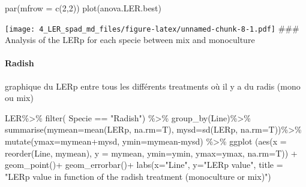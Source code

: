 \documentclass[
]{article}
\newenvironment{Shaded}{\begin{snugshade}}{\end{snugshade}}
\newcommand{\AttributeTok}[1]{\textcolor[rgb]{0.77,0.63,0.00}{#1}}
\newcommand{\DecValTok}[1]{\textcolor[rgb]{0.00,0.00,0.81}{#1}}
\newcommand{\FunctionTok}[1]{\textcolor[rgb]{0.00,0.00,0.00}{#1}}
\newcommand{\NormalTok}[1]{#1}
\newcommand{\SpecialCharTok}[1]{\textcolor[rgb]{0.00,0.00,0.00}{#1}}
\newcommand{\StringTok}[1]{\textcolor[rgb]{0.31,0.60,0.02}{#1}}
\begin{document}
\begin{Shaded}
\begin{Highlighting}[]
\FunctionTok{par}\NormalTok{(}\AttributeTok{mfrow =} \FunctionTok{c}\NormalTok{(}\DecValTok{2}\NormalTok{,}\DecValTok{2}\NormalTok{))}
\FunctionTok{plot}\NormalTok{(anova.LER.best)}
\end{Highlighting}
\end{Shaded}

\texttt{[image: 4\_LER\_spad\_md\_files/figure-latex/unnamed-chunk-8-1.pdf]}
\#\#\# Analysis of the LERp for each specie between mix and monoculture

\hypertarget{radish}{%
\paragraph{Radish}\label{radish}}

graphique du LERp entre tous les différents treatments où il y a du
radis (mono ou mix)

\begin{Shaded}
\begin{Highlighting}[]
\NormalTok{LER}\SpecialCharTok{\%\textgreater{}\%}
  \FunctionTok{filter}\NormalTok{( Specie }\SpecialCharTok{==} \StringTok{"Radish"}\NormalTok{) }\SpecialCharTok{\%\textgreater{}\%}
  \FunctionTok{group\_by}\NormalTok{(Line)}\SpecialCharTok{\%\textgreater{}\%}
  \FunctionTok{summarise}\NormalTok{(}\AttributeTok{mymean=}\FunctionTok{mean}\NormalTok{(LERp, }\AttributeTok{na.rm=}\NormalTok{T),}
            \AttributeTok{mysd=}\FunctionTok{sd}\NormalTok{(LERp, }\AttributeTok{na.rm=}\NormalTok{T))}\SpecialCharTok{\%\textgreater{}\%}
  \FunctionTok{mutate}\NormalTok{(}\AttributeTok{ymax=}\NormalTok{mymean}\SpecialCharTok{+}\NormalTok{mysd, }\AttributeTok{ymin=}\NormalTok{mymean}\SpecialCharTok{{-}}\NormalTok{mysd) }\SpecialCharTok{\%\textgreater{}\%}
  \FunctionTok{ggplot}\NormalTok{ (}\FunctionTok{aes}\NormalTok{(}\AttributeTok{x =} \FunctionTok{reorder}\NormalTok{(Line, mymean), }\AttributeTok{y =}\NormalTok{ mymean,}
              \AttributeTok{ymin=}\NormalTok{ymin, }\AttributeTok{ymax=}\NormalTok{ymax, }\AttributeTok{na.rm=}\NormalTok{T)) }\SpecialCharTok{+} 
  \FunctionTok{geom\_point}\NormalTok{()}\SpecialCharTok{+}
  \FunctionTok{geom\_errorbar}\NormalTok{()}\SpecialCharTok{+}
  \FunctionTok{labs}\NormalTok{(}\AttributeTok{x=}\StringTok{"Line"}\NormalTok{, }\AttributeTok{y=}\StringTok{"LERp value"}\NormalTok{, }\AttributeTok{title =} \StringTok{"LERp value in function of the radish treatment (monoculture or mix)"}\NormalTok{)}
\end{Highlighting}
\end{Shaded}
\end{document}

